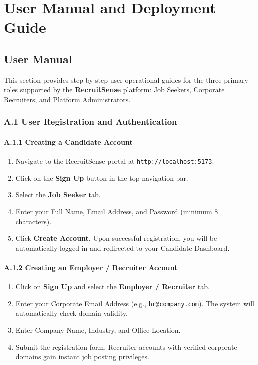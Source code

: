 \chapter{User Manual and Deployment Guide} \label{ap:Appendix1}

\section{User Manual}
This section provides step-by-step user operational guides for the three primary roles supported by the \textbf{RecruitSense} platform: Job Seekers, Corporate Recruiters, and Platform Administrators.

\subsection{A.1 User Registration and Authentication}
\subsubsection{A.1.1 Creating a Candidate Account}
\begin{enumerate}
    \item Navigate to the RecruitSense portal at \texttt{http://localhost:5173}.
    \item Click on the \textbf{Sign Up} button in the top navigation bar.
    \item Select the \textbf{Job Seeker} tab.
    \item Enter your Full Name, Email Address, and Password (minimum 8 characters).
    \item Click \textbf{Create Account}. Upon successful registration, you will be automatically logged in and redirected to your Candidate Dashboard.
\end{enumerate}

\subsubsection{A.1.2 Creating an Employer / Recruiter Account}
\begin{enumerate}
    \item Click on \textbf{Sign Up} and select the \textbf{Employer / Recruiter} tab.
    \item Enter your Corporate Email Address (e.g., \texttt{hr@company.com}). The system will automatically check domain validity.
    \item Enter Company Name, Industry, and Office Location.
    \item Submit the registration form. Recruiter accounts with verified corporate domains gain instant job posting privileges.
\end{enumerate}


